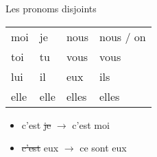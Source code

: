 \begin{frame}{Les pronoms disjoints}
  \begin{center}
    \begin{tabular}{l l l l}
      \alert{moi}  & je   & \alert{nous}  & nous / on \\
      \alert{toi}  & tu   & \alert{vous}  & vous \\
      \alert{lui}  & il   & \alert{eux}   & ils \\
      \alert{elle} & elle & \alert{elles} & elles \\
    \end{tabular}
  \end{center}
  \begin{itemize}
    \item c'est \sout{je} $\to$ c'est \alert{moi}
    \item \sout{c'est} eux $\to$ \alert{ce sont} eux
  \end{itemize}
\end{frame}